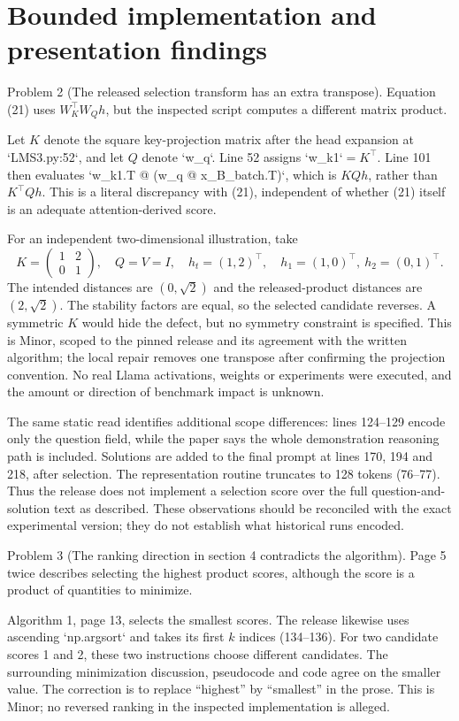\documentclass[10pt]{article}
\begin{document}
\section*{Bounded implementation and presentation findings}
Problem 2 (The released selection transform has an extra transpose).  Equation (21) uses \(W_K^\top W_Qh\), but the inspected script computes a different matrix product.\par
Let \(K\) denote the square key-projection matrix after the head expansion at `LMS3.py:52`, and let \(Q\) denote `w\_q`. Line 52 assigns `w\_k1`\(=K^\top\). Line 101 then evaluates `w\_k1.T @ (w\_q @ x\_B\_batch.T)`, which is \(KQh\), rather than \(K^\top Qh\). This is a literal discrepancy with (21), independent of whether (21) itself is an adequate attention-derived score.\par
For an independent two-dimensional illustration, take \[K=\begin{pmatrix}1&2\\0&1\end{pmatrix},\quad Q=V=I,
 \quad h_t=(1,2)^\top,\quad h_1=(1,0)^\top,\ h_2=(0,1)^\top.\] The intended distances are \((0,\sqrt2)\) and the released-product distances are \((2,\sqrt2)\). The stability factors are equal, so the selected candidate reverses. A symmetric \(K\) would hide the defect, but no symmetry constraint is specified. This is Minor, scoped to the pinned release and its agreement with the written algorithm; the local repair removes one transpose after confirming the projection convention. No real Llama activations, weights or experiments were executed, and the amount or direction of benchmark impact is unknown.\par
The same static read identifies additional scope differences: lines 124–129 encode only the question field, while the paper says the whole demonstration reasoning path is included. Solutions are added to the final prompt at lines 170, 194 and 218, after selection. The representation routine truncates to 128 tokens (76–77). Thus the release does not implement a selection score over the full question-and-solution text as described. These observations should be reconciled with the exact experimental version; they do not establish what historical runs encoded.\par
Problem 3 (The ranking direction in section 4 contradicts the algorithm).  Page 5 twice describes selecting the highest product scores, although the score is a product of quantities to minimize.\par
Algorithm 1, page 13, selects the smallest scores. The release likewise uses ascending `np.argsort` and takes its first \(k\) indices (134–136). For two candidate scores 1 and 2, these two instructions choose different candidates. The surrounding minimization discussion, pseudocode and code agree on the smaller value. The correction is to replace “highest” by “smallest” in the prose. This is Minor; no reversed ranking in the inspected implementation is alleged.\par
\end{document}
